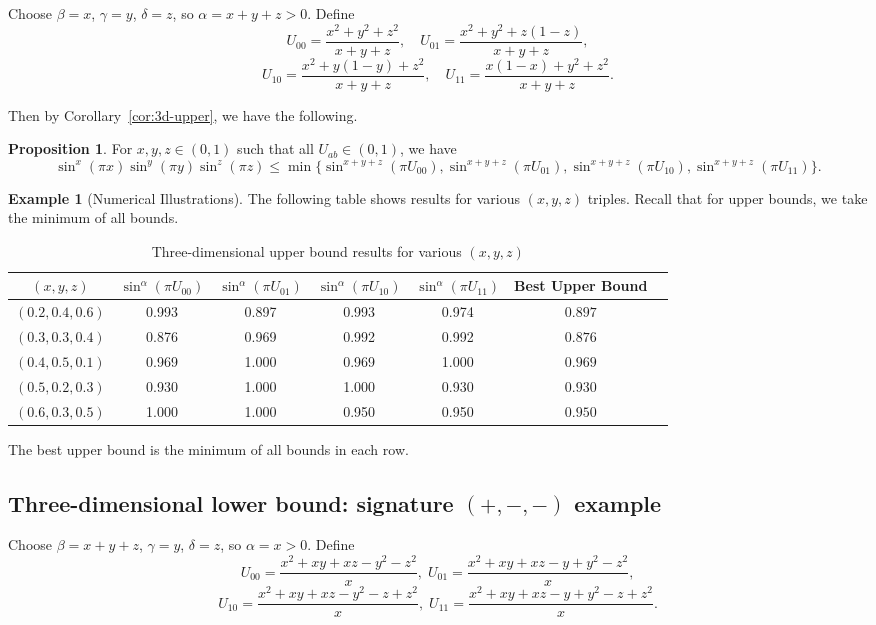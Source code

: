 \documentclass[12pt]{amsart}
\theoremstyle{definition}
\newtheorem{proposition}{Proposition}[section]
\newtheorem{example}{Example}[section]
\begin{document}
Choose $\beta = x$, $\gamma = y$, $\delta = z$, so $\alpha = x + y + z > 0$. Define
\[
U_{00} = \frac{x^2 + y^2 + z^2}{x+y+z}, \quad
U_{01} = \frac{x^2 + y^2 + z(1-z)}{x+y+z},
\]
\[
U_{10} = \frac{x^2 + y(1-y) + z^2}{x+y+z}, \quad
U_{11} = \frac{x(1-x) + y^2 + z^2}{x+y+z}.
\]

Then by Corollary~\ref{cor:3d-upper}, we have the following.
\begin{proposition}\label{prop:3D-prodexamp}
For $x,y,z\in (0,1)$ such that all $U_{ab}\in (0,1)$, we have
\[
\sin^x(\pi x) \sin^y(\pi y) \sin^z(\pi z) \leq \min\{\sin^{x+y+z}(\pi U_{00}), \sin^{x+y+z}(\pi U_{01}), \sin^{x+y+z}(\pi U_{10}), \sin^{x+y+z}(\pi U_{11})\}.
\]
\end{proposition}
\begin{example}[Numerical Illustrations]
The following table shows results for various $(x,y,z)$ triples. Recall that for upper bounds, we take the minimum of all bounds.

\begin{table}[h]
\centering
\caption{Three-dimensional upper bound results for various $(x,y,z)$}
\label{tab:3d-upper-multi}
\begin{tabular}{|c|c|c|c|c|c|c|}
\hline
$(x,y,z)$ & $\sin^{\alpha}(\pi U_{00})$ & $\sin^{\alpha}(\pi U_{01})$ & $\sin^{\alpha}(\pi U_{10})$ & $\sin^{\alpha}(\pi U_{11})$ & Best Upper Bound \\
\hline
$(0.2,0.4,0.6)$ & 0.993 & 0.897 & 0.993 & 0.974 & $ 0.897$ \\
$(0.3,0.3,0.4)$ & 0.876 & 0.969 & 0.992 & 0.992 & $ 0.876$ \\
$(0.4,0.5,0.1)$ & 0.969 & 1.000 & 0.969 & 1.000 &  $ 0.969$ \\
$(0.5,0.2,0.3)$ & 0.930 & 1.000 & 1.000 & 0.930 &  $ 0.930$ \\
$(0.6,0.3,0.5)$ & 1.000 & 1.000 & 0.950 & 0.950 & $ 0.950$ \\
\hline
\end{tabular}
\end{table}
\noindent The best upper bound is the minimum of all bounds in each row.
\end{example}


\subsection{Three-dimensional lower bound: signature $(+,-,-)$ example}

Choose $\beta = x+y+z$, $\gamma = y$, $\delta = z$, so $\alpha = x > 0$. Define
\[
U_{00} = \frac{x^2+xy+xz-y^2-z^2}{x},\;
U_{01} = \frac{x^2+xy+xz-y+y^2-z^2}{x},
\]
\[
U_{10} = \frac{x^2+xy+xz-y^2-z+z^2}{x},\;
U_{11} = \frac{x^2+xy+xz-y+y^2-z+z^2}{x}.
\]
\end{document}

